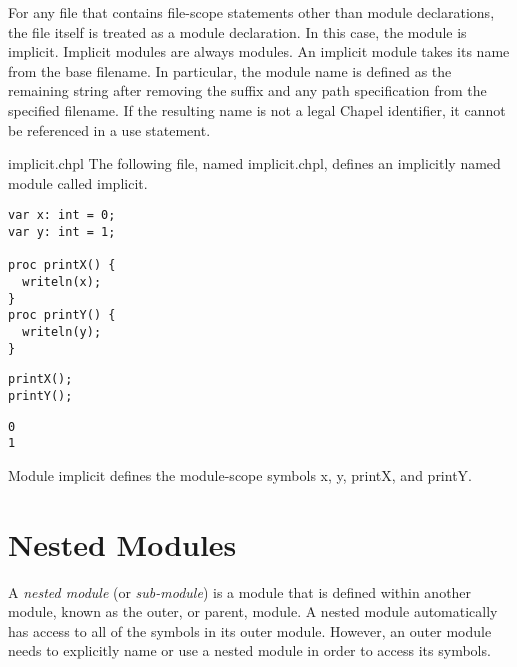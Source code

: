 For any file that contains file-scope statements other than module
declarations, the file itself is treated as a module declaration.
In this case,
the module is implicit. Implicit modules are always 
modules. An implicit module takes its name from the base filename.  In
particular, the module name is defined as the remaining string after
removing the  suffix and any path specification from the
specified filename.  If the resulting name is not a legal Chapel
identifier, it cannot be referenced in a use statement.

\begin{chapelexample}{implicit.chpl}
The following file, named implicit.chpl, defines an implicitly named
module called implicit.
\begin{chapel}
\begin{verbatim}
var x: int = 0;
var y: int = 1;

proc printX() {
  writeln(x);
}
proc printY() {
  writeln(y);
}
\end{verbatim}
\end{chapel}
\begin{chapelpost}
\begin{verbatim}
printX();
printY();
\end{verbatim}
\end{chapelpost}
\begin{chapeloutput}
\begin{verbatim}
0
1
\end{verbatim}
\end{chapeloutput}
Module implicit defines the module-scope symbols x, y, printX, and
printY.
\end{chapelexample}


\section{Nested Modules}
\label{Nested_Modules}

A \emph{nested module} (or \emph{sub-module}) is a module that is
defined within another module, known as the outer, or parent, module.
A nested module automatically has access to all of the symbols in its
outer module.  However, an outer module needs to explicitly name or
use a nested module in order to access its symbols.

